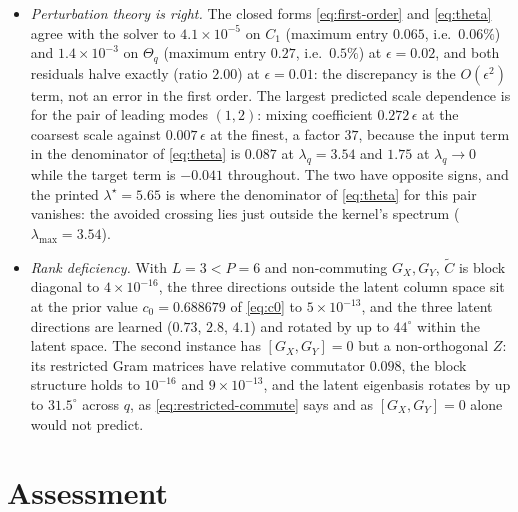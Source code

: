 \documentclass[11pt,a4paper]{article}
\newcommand{\Ct}{\tilde C}
\begin{document}
\begin{itemize}
  \item \emph{Perturbation theory is right.} The closed forms \eqref{eq:first-order} and \eqref{eq:theta} agree with the solver to $4.1\times10^{-5}$ on $C_1$ (maximum entry $0.065$, i.e.\ $0.06\%$) and $1.4\times10^{-3}$ on $\Theta_q$ (maximum entry $0.27$, i.e.\ $0.5\%$) at $\epsilon = 0.02$, and both residuals halve exactly (ratio $2.00$) at $\epsilon = 0.01$: the discrepancy is the $O(\epsilon^2)$ term, not an error in the first order. The largest predicted scale dependence is for the pair of leading modes $(1,2)$: mixing coefficient $0.272\,\epsilon$ at the coarsest scale against $0.007\,\epsilon$ at the finest, a factor $37$, because the input term in the denominator of \eqref{eq:theta} is $0.087$ at $\lambda_q = 3.54$ and $1.75$ at $\lambda_q \to 0$ while the target term is $-0.041$ throughout. The two have opposite signs, and the printed $\lambda^\star = 5.65$ is where the denominator of \eqref{eq:theta} for this pair vanishes: the avoided crossing lies just outside the kernel's spectrum ($\lambda_{\max} = 3.54$).
  \item \emph{Rank deficiency.} With $L = 3 < P = 6$ and non-commuting $G_X, G_Y$, $\Ct$ is block diagonal to $4\times10^{-16}$, the three directions outside the latent column space sit at the prior value $c_0 = 0.688679$ of \eqref{eq:c0} to $5\times10^{-13}$, and the three latent directions are learned ($0.73$, $2.8$, $4.1$) and rotated by up to $44^\circ$ within the latent space. The second instance has $[G_X, G_Y] = 0$ but a non-orthogonal $Z$: its restricted Gram matrices have relative commutator $0.098$, the block structure holds to $10^{-16}$ and $9\times10^{-13}$, and the latent eigenbasis rotates by up to $31.5^\circ$ across $q$, as \eqref{eq:restricted-commute} says and as $[G_X, G_Y] = 0$ alone would not predict.
\end{itemize}

\section{Assessment}
\label{sec:assessment}
\end{document}
